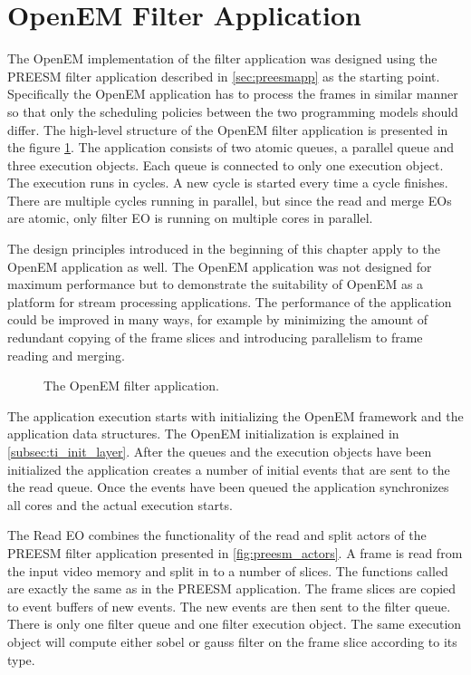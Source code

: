 \section{OpenEM Filter Application}
\label{sec:oemapp}
The OpenEM implementation of the filter application was designed using the
PREESM filter application described in \ref{sec:preesmapp} as the starting
point. Specifically the OpenEM application has to process the frames in similar
manner so that only the scheduling policies between the two programming models
should differ. The high-level structure of the OpenEM filter application is
presented in the figure \ref{fig:openem_flow}. The application consists of two
atomic queues, a parallel queue and three execution objects. Each queue is
connected to only one execution object. The execution runs in cycles. A new
cycle is started every time a cycle finishes. There are multiple cycles running
in parallel, but since the read and merge EOs are atomic, only filter EO is
running on multiple cores in parallel.

The design principles introduced in the beginning of this chapter apply to the
OpenEM application as well. The OpenEM application was not designed for maximum
performance but to demonstrate the suitability of OpenEM as a platform for
stream processing applications. The performance of the application could be
improved in many ways, for example by minimizing the amount of redundant copying
of the frame slices and introducing parallelism to frame reading and merging.

\begin{figure}[h!]
    \begin{center}
        
        \caption{The OpenEM filter application.}
        \label{fig:openem_flow}
    \end{center}
\end{figure}

The application execution starts with initializing the OpenEM framework and the
application data structures. The OpenEM initialization is explained in
\ref{subsec:ti_init_layer}. After the queues and the execution objects have been
initialized the application creates a number of initial events that are sent to
the the read queue. Once the events have been queued the application
synchronizes all cores and the actual execution starts.

The Read EO combines the functionality of the read and split actors of the
PREESM filter application presented in \ref{fig:preesm_actors}. A frame is read
from the input video memory and split in to a number of slices. The functions
called are exactly the same as in the PREESM application. The frame slices are
copied to event buffers of new events. The new events are then sent to the
filter queue. There is only one filter queue and one filter execution object.
The same execution object will compute either sobel or gauss filter on the
frame slice according to its type.

